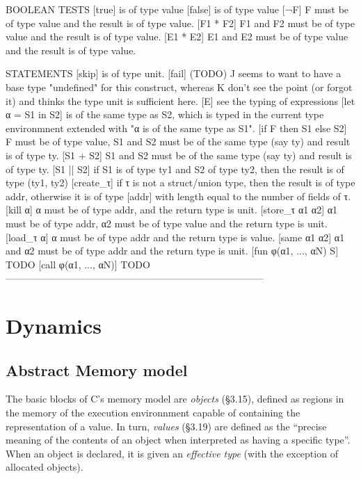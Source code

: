 \documentclass[12pt, a4paper]{article}
\begin{document}
  BOOLEAN TESTS
    [true]        is of type value
    [false]       is of type value
    [¬F]          F must be of type value and the result is of type value.
    [F1 * F2]     F1 and F2 must be of type value and the result is of type value.
    [E1 * E2]     E1 and E2 must be of type value and the result is of type value.
  
  STATEMENTS
    [skip]                  is of type unit.
    [fail]                  (TODO) J seems to want to have a base type
                            "undefined" for this construct, whereas K don't see
                            the point (or forgot it) and thinks the type unit is
                            sufficient here.
    [E]                     see the typing of expressions
    [let α = S1 in S2]      is of the same type as S2, which is typed in the
                            current type environmnent extended with "α is of the
                            same type as S1".
    [if F then S1 else S2]  F must be of type value, S1 and S2 must be of the
                            same type (say ty) and result is of type ty.
    [S1 + S2]               S1 and S2 must be of the same type (say ty) and
                            result is of type ty.
    [S1 || S2]              if S1 is of type ty1 and S2 of type ty2, then the
                            result is of type (ty1, ty2)
    [create\_τ]              if τ is not a struct/union type, then the result is
                            of type addr, otherwise it is of type [addr] with
                            length equal to the number of fields of τ.
    [kill α]                α must be of type addr, and the return type is unit.
    [store\_τ α1 α2]         α1 must be of type addr, α2 must be of type value
                            and the return type is unit.
    [load\_τ α]              α must be of type addr and the return type is value.
    [same α1 α2]            α1 and α2 must be of type addr and the return type
                            is unit.
    [fun φ(α1, ..., αN) S]  TODO
    [call φ(α1, ..., αN)]   TODO
--------------------------------------------------------------------------------


\section{Dynamics}\label{dynamics}

\subsection{Abstract Memory model}
The basic blocks of C's memory model are {\it objects} (§3.15), defined
as regions in the memory of the execution environnment capable of
containing the representation of a value. In turn, {\it values}
(§3.19) are defined as the ``precise meaning of the contents of an
object when interpreted as having a specific type''. When an object is
declared, it is given an {\it effective type} (with the exception of
allocated objects).
\end{document}
